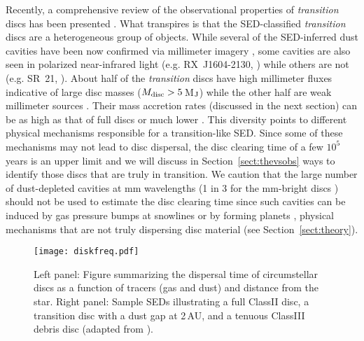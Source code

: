 \documentclass{rsos}
\begin{document}
Recently, a comprehensive review of the observational properties of {\it transition} discs has been presented  \cite{2014prpl.conf..497E}. What transpires is that the SED-classified {\it transition} discs are a heterogeneous group of objects. While several of the SED-inferred dust cavities have been now confirmed via millimeter imagery 
\cite{2009ApJ...704..496B,2011ApJ...732...42A,2013ApJ...775..136R},  some cavities are also seen in polarized near-infrared light 
(e.g. RX~J1604-2130, \cite{2012ApJ...760L..26M}) while others are not (e.g. SR~21, \cite{2013ApJ...767...10F}). About half of the {\it transition} discs have high millimeter fluxes indicative of large disc masses ($M_{\rm disc}>5$\,M$_{\rm J}$) while the other half are weak millimeter sources 
\cite{2016A&A...592A.126V}. Their mass accretion rates (discussed in the next section) can be as high as that of full discs 
\cite{2014A&A...568A..18M} or much lower 
\cite{2010ApJ...712..925C}. 
This diversity points to different physical mechanisms responsible for a transition-like SED. Since some of these mechanisms may not lead to disc dispersal, the disc clearing time of a few $10^5$ years is an upper limit and we will discuss in Section~\ref{sect:thevsobs} ways to identify those discs that are truly in transition.
We caution that the large number of dust-depleted cavities at mm wavelengths (1 in 3 for the mm-bright discs \cite{2011ApJ...732...42A}) should not be used to estimate the disc clearing time since such cavities can be induced by gas pressure bumps at snowlines or by forming planets 
\cite{2012ApJ...755....6Z}, physical mechanisms that are not truly dispersing disc material (see Section~\ref{sect:theory}).

\begin{figure}[b]
\centering
\texttt{[image: diskfreq.pdf]}
\caption{Left panel: Figure summarizing the dispersal time of circumstellar discs as a function of tracers (gas and dust) and distance from the star. Right panel: Sample SEDs illustrating a full ClassII disc, a transition disc with a dust gap at 2\,AU, and a tenuous ClassIII debris disc (adapted from \cite{2010pdac.book..263P}).}\label{fig:diskfreq}
\end{figure}
\end{document}
